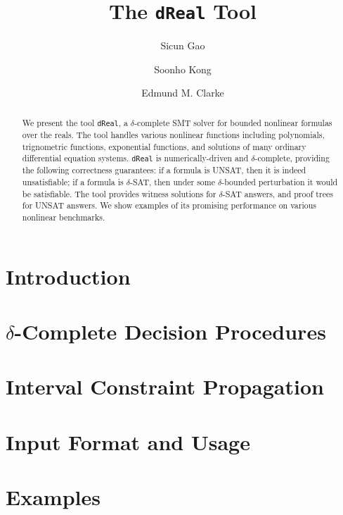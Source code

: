 \documentclass[envcountsect]{llncs}
\title{The {\tt dReal} Tool}
\author{Sicun Gao \and Soonho Kong \and Edmund M. Clarke}
\institute{Carnegie Mellon University, Pittsburgh, PA 15213}
\begin{document}
\maketitle

\begin{abstract}
We present the tool {\tt dReal}, a $\delta$-complete SMT solver for bounded
nonlinear formulas over the reals. The tool handles various nonlinear functions
including polynomials, trignometric functions, exponential functions, and
solutions of many ordinary differential equation systems. {\tt dReal} is
numerically-driven and $\delta$-complete, providing the following correctness
guarantees: if a formula is UNSAT, then it is indeed unsatisfiable; if a
formula is $\delta$-SAT, then under some $\delta$-bounded perturbation it would
be satisfiable. The tool provides witness solutions for $\delta$-SAT answers,
and proof trees for UNSAT answers. We show examples of its promising
performance on various nonlinear benchmarks. 
\end{abstract}

\section{Introduction}

\section{$\delta$-Complete Decision Procedures}

\section{Interval Constraint Propagation}

\section{Input Format and Usage}

\section{Examples}




\end{document}
